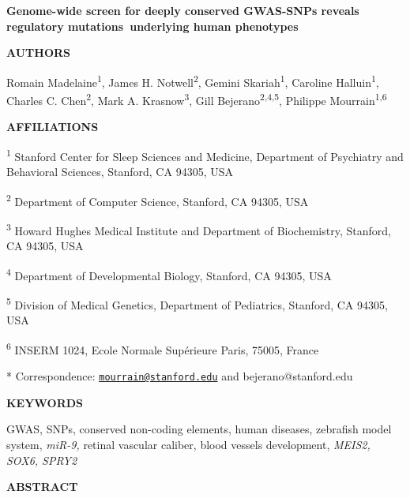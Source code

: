 \documentclass[]{article}
\date{}
\begin{document}
\textbf{Genome-wide screen for deeply conserved GWAS-SNPs reveals
regulatory mutations~underlying human phenotypes}

\textbf{AUTHORS}

Romain Madelaine\textsuperscript{1}, James H.
Notwell\textsuperscript{2}, Gemini Skariah\textsuperscript{1}, Caroline
Halluin\textsuperscript{1}, Charles C. Chen\textsuperscript{2}, Mark A.
Krasnow\textsuperscript{3}, Gill Bejerano\textsuperscript{2,4,5},
Philippe Mourrain\textsuperscript{1,6}

\textbf{AFFILIATIONS}

\textsuperscript{1} Stanford Center for Sleep Sciences and Medicine,
Department of Psychiatry and Behavioral Sciences, Stanford, CA 94305,
USA

\textsuperscript{2} Department of Computer Science, Stanford, CA 94305,
USA

\textsuperscript{3} Howard Hughes Medical Institute and Department of
Biochemistry, Stanford, CA 94305, USA

\textsuperscript{4} Department of Developmental Biology, Stanford, CA
94305, USA

\textsuperscript{5} Division of Medical Genetics, Department of
Pediatrics, Stanford, CA 94305, USA

\textsuperscript{6} INSERM 1024, Ecole Normale Supérieure Paris, 75005,
France

* Correspondence:
\href{mailto:mourrain@stanford.edu}{\nolinkurl{mourrain@stanford.edu}}
and bejerano@stanford.edu

\textbf{KEYWORDS}

GWAS, SNPs, conserved non-coding elements, human diseases, zebrafish
model system, \emph{miR-9,} retinal vascular caliber, blood vessels
development, \emph{MEIS2, SOX6, SPRY2}\textbf{\\
}

\textbf{ABSTRACT }
\end{document}
